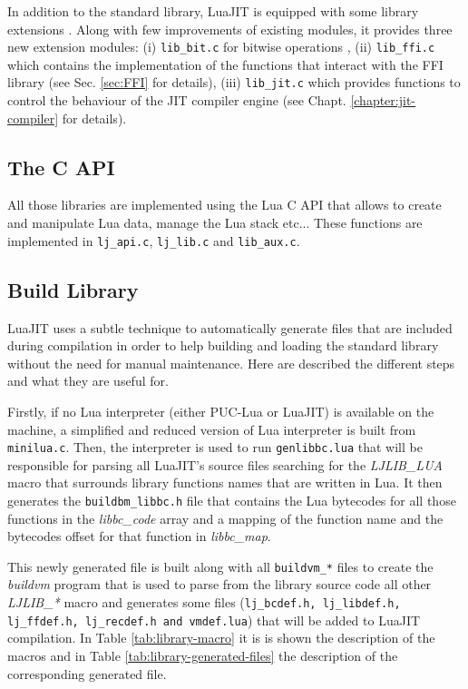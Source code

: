 In addition to the standard library, LuaJIT is equipped with some library extensions \cite{extensions}. Along with few improvements of existing modules, it provides three new extension modules: (i) \texttt{lib\_bit.c} for bitwise operations \cite{bitOp}, (ii) \texttt{lib\_ffi.c} which contains the implementation of the functions that interact with the FFI library (see Sec. \ref{sec:FFI} for details), (iii) \texttt{lib\_jit.c} which provides functions to control the behaviour of the JIT compiler engine (see Chapt. \ref{chapter:jit-compiler} for details).

\subsection{The C API}
\label{Subsec:c-api}

All those libraries are implemented using the Lua C API that allows to create and manipulate Lua data, manage the Lua stack etc... These functions are implemented in \texttt{lj\_api.c}, \texttt{lj\_lib.c} and \texttt{lib\_aux.c}.

\subsection{Build Library}
\label{Subsec:build-lib}

LuaJIT uses a subtle technique to automatically generate files that are included during compilation in order to help building and loading the standard library
without the need for manual maintenance. Here are described the different steps and what they are useful for.

Firstly, if no Lua interpreter (either PUC-Lua or LuaJIT) is available on the machine, a simplified and reduced version of Lua interpreter is built from \texttt{minilua.c}. Then, the interpreter is used to run \texttt{genlibbc.lua} that will be responsible for parsing all LuaJIT's source files searching for the \emph{LJLIB\_LUA} macro that surrounds library
functions names that are written in Lua. It then generates the \texttt{buildbm\_libbc.h} file that contains the Lua bytecodes for all those functions in the \emph{libbc\_code} array and a mapping of the function name and the bytecodes offset for that function in \emph{libbc\_map}.

This newly generated file is built along with all \texttt{buildvm\_*} files to create the \emph{buildvm} program that is used to parse from the library source code all other
\emph{LJLIB\_*} macro and generates some files (\texttt{lj\_bcdef.h, lj\_libdef.h, lj\_ffdef.h, lj\_recdef.h and vmdef.lua}) that will be added to LuaJIT compilation. In Table \ref{tab:library-macro} it is is shown the description of the macros and in Table \ref{tab:library-generated-files} the description of the corresponding generated file.

